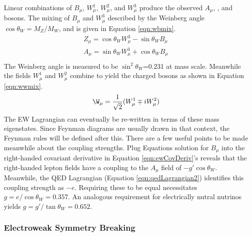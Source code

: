 Linear combinations of $B_\mu$, $W_\mu^1$, $W_\mu^2$, and $W_\mu^3$ produce the observed $A_\mu$, \Z, and \W bosons.
The mixing of $B_\mu$ and $W_\mu^3$ described by the Weinberg angle $\cos\theta_W=M_Z/M_W$, and is given in Equation \ref{eqn:wbmix}.
\begin{equation}\begin{split}\label{eqn:wbmix}
    Z_\mu=\cos\theta_W W^3_\mu-\sin\theta_W B_\mu \\
    A_\mu=\sin\theta_W W^3_\mu+\cos\theta_W B_\mu \\
\end{split}\end{equation} 
The Weinberg angle is measured to be $\sin^2\theta_W$=0.231 at \Z mass scale.
Meanwhile the fields $W_\mu^1$ and $W_\mu^2$ combine to yield the charged \W bosons as shown in Equation \ref{eqn:wwmix}.
\begin{equation}\begin{split}\label{eqn:wwmix}
    \W_\mu=\frac{1}{\sqrt{2}}(W_\mu^1\mp iW_\mu^2)
\end{split}\end{equation} 
The EW Lagrangian can eventually be re-written in terms of these mass eigenstates.
Since Feynman diagrams are usually drawn in that context, the Feynman rules will be defined after this.
There are a few useful points to be made meanwhile about the coupling strengths.
Plug Equations \label{eqn:wbmix} solution for $B_\mu$ into the right-handed covariant derivative in Equation \ref{eqn:ewCovDeriv}'s reveals that the right-handed lepton fields have a coupling to the $A_\mu$ field of $-g'\cos\theta_W$.
Meanwhile, the QED Lagrangian (Equation \ref{eqn:qedLagrangian2}) identifies this coupling strength as $-e$.
Requiring these to be equal necessitates $g=e/\cos\theta_W=0.357$.
An analogous requirement for electrically nutral nutrinos yields $g=g'/\tan\theta_W=0.652$.

\subsubsection{Electroweak Symmetry Breaking}\label{sec:higgsMechanism}

